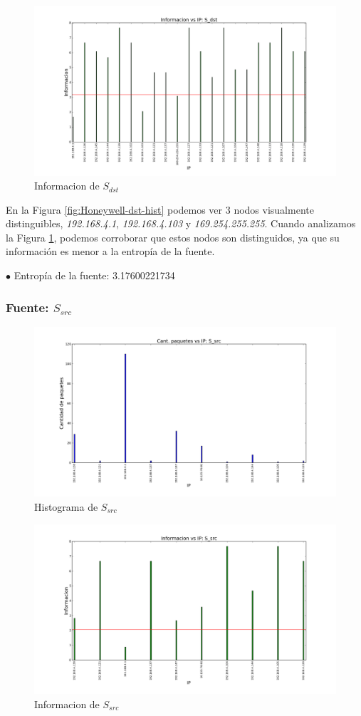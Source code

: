 \begin{figure}[H]\centering
    \includegraphics[width=0.8\linewidth]{../imgs/red-honeywell_S_dst_info.png}
    \caption{Informacion de $S_{dst}$}\label{fig:Honeywell-dst-info}
\end{figure}
En la Figura \ref{fig:Honeywell-dst-hist} podemos ver 3 nodos visualmente distinguibles, \emph{192.168.4.1}, \emph{192.168.4.103} y \emph{169.254.255.255}.
Cuando analizamos la Figura \ref{fig:Honeywell-dst-info}, podemos corroborar que estos nodos son distinguidos, ya que su información es menor a la entropía de la fuente.

$\bullet$ Entropía de la fuente: 3.17600221734

\subsubsection{Fuente: $S_{src}$}

\begin{figure}[H]\centering
    \includegraphics[width=0.8\linewidth]{../imgs/red-honeywell_S_src_hist.png}
    \caption{Histograma de $S_{src}$}\label{fig:Honeywell-src-hist}
\end{figure}

\begin{figure}[H]\centering
    \includegraphics[width=0.8\linewidth]{../imgs/red-honeywell_S_src_info.png}
    \caption{Informacion de $S_{src}$}\label{fig:Honeywell-src-info}
\end{figure}

